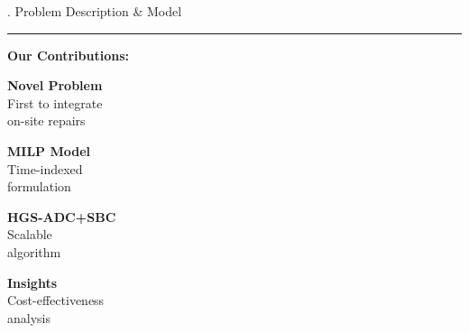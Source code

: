 \begin{block}{\fontsize{46}{54}. Problem Description \& Model}
    \vspace{0.6cm}
    \hrule
    \vspace{0.5cm}
    
    {\fontsize{40}{48}\selectfont \textbf{Our Contributions:}}
    
    \vspace{0.5cm}
    \noindent
    \colorbox{HKUGreen!20}{\parbox{0.23\linewidth}{\centering
        \vspace{0.3cm}
        {\fontsize{34}{40}\selectfont \textbf{Novel Problem}}\\[0.25cm]
        {\fontsize{30}{36}\selectfont First to integrate\\on-site repairs}
        \vspace{0.3cm}
    }}%
    \hfill
    \colorbox{AccentGold!25}{\parbox{0.23\linewidth}{\centering
        \vspace{0.3cm}
        {\fontsize{34}{40}\selectfont \textbf{MILP Model}}\\[0.25cm]
        {\fontsize{30}{36}\selectfont Time-indexed\\formulation}
        \vspace{0.3cm}
    }}%
    \hfill
    \colorbox{HKUGreen!20}{\parbox{0.23\linewidth}{\centering
        \vspace{0.3cm}
        {\fontsize{34}{40}\selectfont \textbf{HGS-ADC+SBC}}\\[0.25cm]
        {\fontsize{30}{36}\selectfont Scalable\\algorithm}
        \vspace{0.3cm}
    }}%
    \hfill
    \colorbox{AccentGold!25}{\parbox{0.23\linewidth}{\centering
        \vspace{0.3cm}
        {\fontsize{34}{40}\selectfont \textbf{Insights}}\\[0.25cm]
        {\fontsize{30}{36}\selectfont Cost-effectiveness\\analysis}
        \vspace{0.3cm}
    }}

\end{block}
